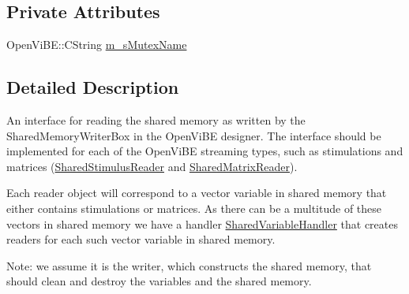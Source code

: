 \subsection*{Private Attributes}
\begin{DoxyCompactItemize}
\item 
OpenViBE::CString \hyperlink{classOpenViBEApplications_1_1ISharedMemoryReader_affed657b86f9796a264c9422b2b93fbd}{m\_\-sMutexName}
\end{DoxyCompactItemize}


\subsection{Detailed Description}
An interface for reading the shared memory as written by the SharedMemoryWriterBox in the OpenViBE designer. The interface should be implemented for each of the OpenViBE streaming types, such as stimulations and matrices (\hyperlink{classOpenViBEApplications_1_1SharedStimulusReader}{SharedStimulusReader} and \hyperlink{classOpenViBEApplications_1_1SharedMatrixReader}{SharedMatrixReader}).\par
 Each reader object will correspond to a vector variable in shared memory that either contains stimulations or matrices. As there can be a multitude of these vectors in shared memory we have a handler \hyperlink{classOpenViBEApplications_1_1ISharedMemoryReader_1_1SharedVariableHandler}{SharedVariableHandler} that creates readers for each such vector variable in shared memory.\par
 Note: we assume it is the writer, which constructs the shared memory, that should clean and destroy the variables and the shared memory. 

